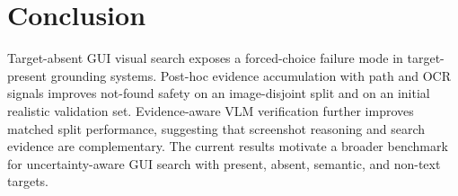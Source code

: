 \section{Conclusion}

Target-absent GUI visual search exposes a forced-choice failure mode in target-present grounding systems. Post-hoc evidence accumulation with path and OCR signals improves not-found safety on an image-disjoint split and on an initial realistic validation set. Evidence-aware VLM verification further improves matched split performance, suggesting that screenshot reasoning and search evidence are complementary. The current results motivate a broader benchmark for uncertainty-aware GUI search with present, absent, semantic, and non-text targets.
